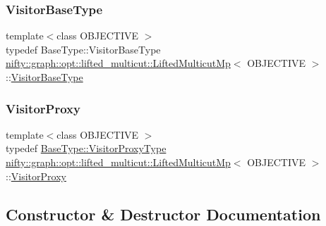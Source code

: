 \subsubsection{\texorpdfstring{Visitor\+Base\+Type}{VisitorBaseType}}
{\footnotesize\ttfamily template$<$class O\+B\+J\+E\+C\+T\+I\+VE $>$ \\
typedef Base\+Type\+::\+Visitor\+Base\+Type \hyperlink{classnifty_1_1graph_1_1opt_1_1lifted__multicut_1_1LiftedMulticutMp}{nifty\+::graph\+::opt\+::lifted\+\_\+multicut\+::\+Lifted\+Multicut\+Mp}$<$ O\+B\+J\+E\+C\+T\+I\+VE $>$\+::\hyperlink{classnifty_1_1graph_1_1opt_1_1lifted__multicut_1_1LiftedMulticutMp_a8169f3c3105c3179ae7a2881502826bd}{Visitor\+Base\+Type}}

\mbox{\label{classnifty_1_1graph_1_1opt_1_1lifted__multicut_1_1LiftedMulticutMp_adcaaef01d0a495768cb27f4b6f20c8e1}} 
\subsubsection{\texorpdfstring{Visitor\+Proxy}{VisitorProxy}}
{\footnotesize\ttfamily template$<$class O\+B\+J\+E\+C\+T\+I\+VE $>$ \\
typedef \hyperlink{classnifty_1_1graph_1_1opt_1_1common_1_1SolverBase_ad209b469b3bc9fc0fc14e9fed4d09075}{Base\+Type\+::\+Visitor\+Proxy\+Type} \hyperlink{classnifty_1_1graph_1_1opt_1_1lifted__multicut_1_1LiftedMulticutMp}{nifty\+::graph\+::opt\+::lifted\+\_\+multicut\+::\+Lifted\+Multicut\+Mp}$<$ O\+B\+J\+E\+C\+T\+I\+VE $>$\+::\hyperlink{classnifty_1_1graph_1_1opt_1_1lifted__multicut_1_1LiftedMulticutMp_adcaaef01d0a495768cb27f4b6f20c8e1}{Visitor\+Proxy}}



\subsection{Constructor \& Destructor Documentation}
\mbox{\label{classnifty_1_1graph_1_1opt_1_1lifted__multicut_1_1LiftedMulticutMp_adca237320fdfa68a56960fbe01bd6000}} 
